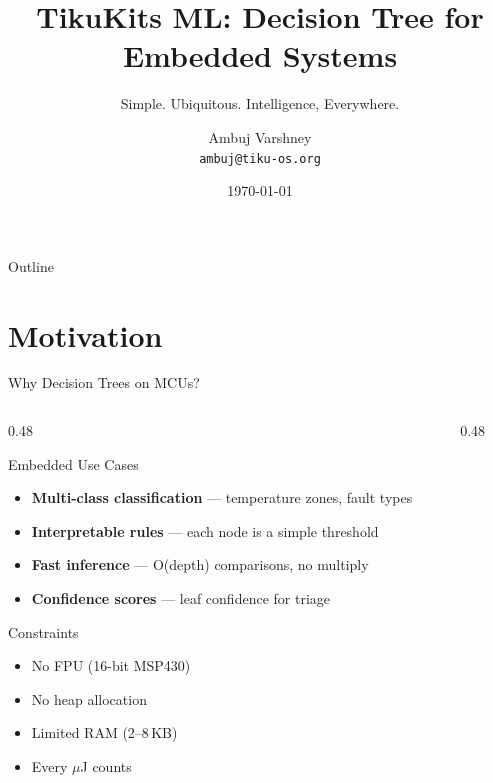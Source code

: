 \documentclass[aspectratio=169, 10pt]{beamer}
\title[TikuKits ML]{TikuKits ML: Decision Tree for Embedded Systems}
\subtitle{Simple. Ubiquitous. Intelligence, Everywhere.}
\author[Ambuj Varshney]{Ambuj Varshney \\ \texttt{ambuj@tiku-os.org}}
\date{\today}
\begin{document}
\begin{frame}
\titlepage
\end{frame}

\begin{frame}{Outline}
\tableofcontents
\end{frame}

\section{Motivation}

\begin{frame}{Why Decision Trees on MCUs?}
\begin{columns}[T]
\begin{column}{0.48\textwidth}
\begin{block}{Embedded Use Cases}
\begin{itemize}
  \item \textbf{Multi-class classification} --- temperature zones, fault types
  \item \textbf{Interpretable rules} --- each node is a simple threshold
  \item \textbf{Fast inference} --- O(depth) comparisons, no multiply
  \item \textbf{Confidence scores} --- leaf confidence for triage
\end{itemize}
\end{block}

\begin{block}{Constraints}
\begin{itemize}
  \item No FPU (16-bit MSP430)
  \item No heap allocation
  \item Limited RAM (2--8\,KB)
  \item Every $\mu$J counts
\end{itemize}
\end{block}
\end{column}

\begin{column}{0.48\textwidth}
\begin{center}
\end{center}
\end{column}
\end{columns}
\end{frame}
\end{document}
